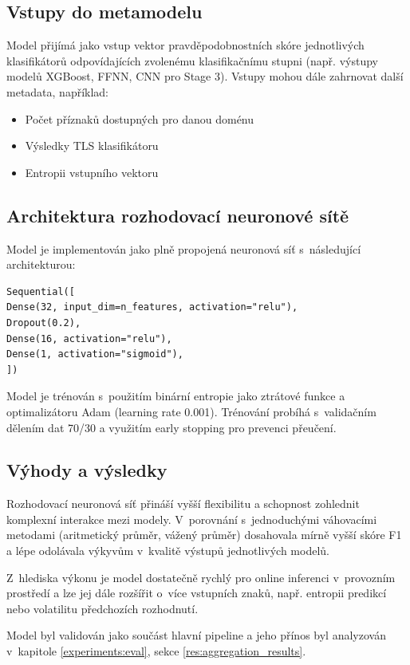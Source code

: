 \subsection{Vstupy do metamodelu}
Model přijímá jako vstup vektor pravděpodobnostních skóre jednotlivých klasifikátorů odpovídajících zvolenému klasifikačnímu stupni (např. výstupy modelů XGBoost, FFNN, CNN pro Stage 3). Vstupy mohou dále zahrnovat další metadata, například:
\begin{itemize}
\item Počet příznaků dostupných pro danou doménu
\item Výsledky TLS klasifikátoru
\item Entropii vstupního vektoru
\end{itemize}

\subsection{Architektura rozhodovací neuronové sítě}
Model je implementován jako plně propojená neuronová síť s~následující architekturou:

\begin{verbatim}
Sequential([
Dense(32, input_dim=n_features, activation="relu"),
Dropout(0.2),
Dense(16, activation="relu"),
Dense(1, activation="sigmoid"),
])
\end{verbatim}

Model je trénován s~použitím binární entropie jako ztrátové funkce a optimalizátoru Adam (learning rate 0.001). Trénování probíhá s~validačním dělením dat 70/30 a využitím early stopping pro prevenci přeučení.

\subsection{Výhody a výsledky}
Rozhodovací neuronová síť přináší vyšší flexibilitu a schopnost zohlednit komplexní interakce mezi modely. V~porovnání s~jednoduchými váhovacími metodami (aritmetický průměr, vážený průměr) dosahovala mírně vyšší skóre F1 a lépe odolávala výkyvům v~kvalitě výstupů jednotlivých modelů.

Z~hlediska výkonu je model dostatečně rychlý pro online inferenci v~provozním prostředí a lze jej dále rozšířit o~více vstupních znaků, např. entropii predikcí nebo volatilitu předchozích rozhodnutí.

Model byl validován jako součást hlavní pipeline a jeho přínos byl analyzován v~kapitole \ref{experiments:eval}, sekce \ref{res:aggregation_results}.

